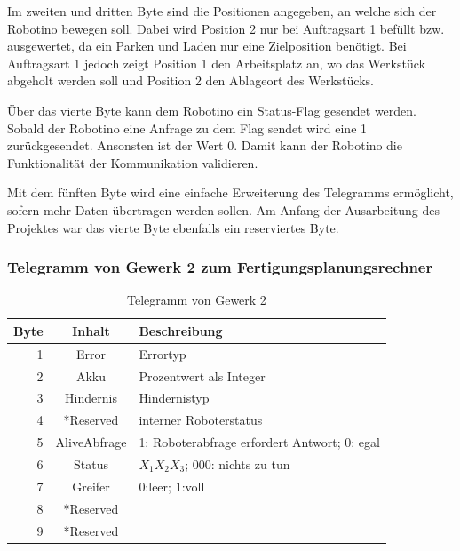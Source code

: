 Im zweiten und dritten Byte sind die Positionen angegeben, an welche sich der Robotino bewegen soll. Dabei wird Position 2 nur bei Auftragsart 1 befüllt bzw. ausgewertet, da ein Parken und Laden nur eine Zielposition benötigt. Bei Auftragsart 1 jedoch zeigt Position 1 den Arbeitsplatz an, wo das Werkstück abgeholt werden soll und Position 2 den Ablageort des Werkstücks. 

Über das vierte Byte kann dem Robotino ein Status-Flag gesendet werden. Sobald der Robotino eine Anfrage zu dem Flag sendet wird eine 1 zurückgesendet. Ansonsten ist der Wert 0. Damit kann der Robotino die Funktionalität der Kommunikation validieren.

Mit dem fünften Byte wird eine einfache Erweiterung des Telegramms ermöglicht, sofern mehr Daten übertragen werden sollen. Am Anfang der Ausarbeitung des Projektes war das vierte Byte ebenfalls ein reserviertes Byte. 

\subsubsection{Telegramm von Gewerk 2 zum Fertigungsplanungsrechner}


\begin{table}[!ht]
	\centering
	\begin{tabular}{|r|c|l|}
		\hline
		Byte & Inhalt	&	Beschreibung \\
		\hline
			1  & Error &  Errortyp  \\
			2  & Akku  & Prozentwert als Integer \\
			3  & Hindernis & Hindernistyp \\
		  4  & *Reserved &  interner Roboterstatus \\
		  5  & AliveAbfrage  & 1: Roboterabfrage erfordert Antwort; 0: egal \\
		  6  & Status & $X_1X_2X_3$; 000: nichts zu tun \\
		  7  & Greifer   & 0:leer; 1:voll \\
		  8  & *Reserved &  \\
		  9  & *Reserved   &  \\
		\hline
	\end{tabular}
	\caption{Telegramm von Gewerk 2}
	\label{tab:TelegrammVonG2}
\end{table}


